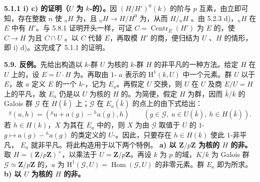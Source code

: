 \textbf{5.1.1 i) c) 的证明（$U$ 为 $k$-的）。}因 $(H/H')^0(k)$ 的阶与 $p$ 互素，由立即可知，存在整数 $n$ 使 ${}_nH$ 为，且 ${}_nH\to H/H^0$ 为，从而 $H/{}_nH$ 。由 5.2.3 d)，${}_nH$ 在 $E$ 中有 $H'$。与 5.8.1 证明开头一样，可证 $C=\operatorname{Centr}_E(H')$ 为 $E$ 的，使 $C\to H$ 为且 $C\cap U$ 。以 $C$ 代替 $E$，再取模 $H'$ 的商，便归结为 $U$ 、$H$ 的情形，即 i) d)。这完成了 5.1.1 的证明。

\textbf{5.9. 反例。}先给出构造以 $k$-群 $U$ 为核的 $k$-群 $H$ 的非平凡的一种方法。给定 $H$ 在 $U$ 上的，设 $E=U\cdot H$ 为。再取由 $1$- $a$ 表示的 $\mathrm H^1(k,U)$ 中一个元素。群 $U$
以于 $E$，故 $a$ 定义 $E$ 的一个 $k$-，记为 $E_a$。再假定 $U$ 交换，则 $U$ 在 $U$ 及商 $E/U=H$ 上的平凡，故 $E_a$ 仍是以 $U$ 为核的 $H$ 的。为简便，假定 $H$ 为群，因而 $\bar k/k$ 的 Galois 群 $\mathscr G$ 在 $H(\bar k)$ 上；$\mathscr G$ 在 $E_a(\bar k)$ 的点上的由下式给出：
\[{}^g(u,h)=({}^gu+a(g)-{}^ha(g),h)
\qquad(g\in\mathscr G,\ u\in U(\bar k),\ h\in H(\bar k)).\]
若 $h\in H(k)$，$X$ 为其在 $E_a$ 中的，则 $X$ 为由 $\mathscr G$ 取值于 $U$ 的 $1$- $g\mapsto a(g)-{}^ha(g)$ 的类定义的 $U$-。因此，只要存在 $h\in H(k)$ 使此 $1$-非平凡， $E_a$ 就非平凡。将此构造用于以下两个特例。
\textbf{a) 以 $\mathbf Z/p\mathbf Z$ 为核的 $H$ 的非。}
取 $H=(\mathbf Z/p\mathbf Z)^\times$，以乘法于 $U=\mathbf Z/p\mathbf Z$。再设 $k$ 为 $p$ 的域，$K/k$ 为 Galois 群 $\mathscr G\simeq\mathbf Z/p\mathbf Z$ 的，$a$ 为 $\mathrm H^1(\mathscr G,U)=\operatorname{Hom}(\mathscr G,U)$ 的非零元素。群 $E_a$ 即为所求。
\textbf{b) 以 $U$ 为核的 $H$ 的非。}
